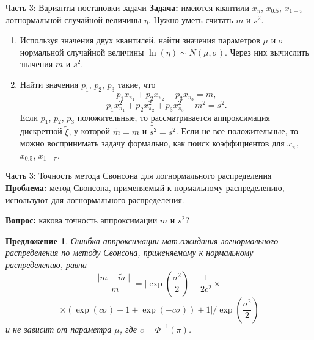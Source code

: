 \documentclass[ucs, notheorems, handout]{beamer}
\newtheorem{proposition2}[theorem]{Предложение}
\begin{document}
\begin{frame}{Часть 3: Варианты постановки задачи}
	\textbf{Задача:} имеются квантили $x_{\pi}$, $x_{0.5}$, $x_{1-\pi}$ логнормальной случайной величины $\eta$. Нужно уметь считать $m$ и $s^{2}$.
	
	\begin{enumerate}
		\item Используя значения двух квантилей, найти значения параметров $\mu$ и $\sigma$ нормальной случайной величины $\ln(\eta)\sim N(\mu, \sigma)$. Через них вычислить значения $m$ и $s^{2}$.
		\item Найти значения $p_{1}$, $p_{2}$, $p_{3}$ такие, что 
		\begin{equation*}
			p_{1}x_{\pi_{1}} + p_{2}x_{\pi_{2}} + p_{3}x_{\pi_{3}} = m, \label{2}
		\end{equation*}
		\begin{equation*}
			p_{1} x_{\pi_{1}}^{2} + p_{2} x_{\pi_{2}}^{2} + p_{3} x_{\pi_{3}}^{2} - m^{2} = s^{2}.
		\end{equation*}
		Если $p_{1}$, $p_{2}$, $p_{3}$ положительные, то рассматривается аппроксимация дискретной $\tilde{\xi}$, у которой $\tilde{m} = m$ и $\tilde{s^{2}}=s^{2}$.
		Если не все положительные, то можно воспринимать задачу формально, как поиск коэффициентов для $x_{\pi}$, $x_{0.5}$, $x_{1-\pi}$. 
	\end{enumerate}
\end{frame}

\begin{frame}{Часть 3: Точность метода Свонсона для логнормального распределения}
	\textbf{Проблема:} метод Свонсона, применяемый к нормальному распределению, используют для логнормального распределения.
	
	\textbf{Вопрос:} какова точность аппроксимации $m$ и $s^{2}$?
	
	\begin{proposition2}\label{pr5}
		Ошибка аппроксимации мат.ожидания логнормального распределения по методу Свонсона, применяемому к нормальному распределению, равна
		\[\dfrac{\mid m - \widetilde{m} \mid}{m} = \biggl| \exp\left( \dfrac{\sigma^{2}}{2}\right)  - \dfrac{1}{2 c^{2}}\times\]\[\times(\exp(c\sigma)-1 +\exp(-c\sigma)) + 1 \biggr|/\exp\left(\dfrac{\sigma^{2}}{2}\right)\]
		и не зависит от параметра $\mu$, где $c = \Phi^{-1}(\pi)$.
	\end{proposition2}
\end{frame}
\end{document}
